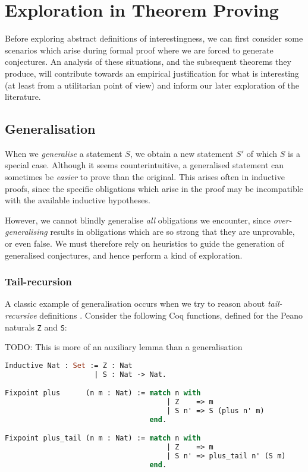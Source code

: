 \documentclass[]{article}
\begin{document}
\section{Exploration in Theorem Proving}
\label{examples}

Before exploring abstract definitions of interestingness, we can first consider some scenarios which arise during formal proof where we are forced to generate conjectures. An analysis of these situations, and the subsequent theorems they produce, will contribute towards an empirical justification for what is interesting (at least from a utilitarian point of view) and inform our later exploration of the literature.

\subsection{Generalisation}

\providecommand{\coq}[1]{\lstinline[language=ML]|#1|}

When we \emph{generalise} a statement $S$, we obtain a new statement $S'$ of which $S$ is a special case. Although it seems counterintuitive, a generalised statement can sometimes be \emph{easier} to prove than the original. This arises often in inductive proofs, since the specific obligations which arise in the proof may be incompatible with the available inductive hypotheses.

However, we cannot blindly generalise \emph{all} obligations we encounter, since \emph{over-generalising} results in obligations which are so strong that they are unprovable, or even false. We must therefore rely on heuristics to guide the generation of generalised conjectures, and hence perform a kind of exploration.

\subsubsection{Tail-recursion}

A classic example of generalisation occurs when we try to reason about \emph{tail-recursive} definitions \cite{kapur2003automatic}. Consider the following Coq functions, defined for the Peano naturals \coq{Z} and \coq{S}:

TODO: This is more of an auxiliary lemma than a generalisation

\begin{lstlisting}[language=ML, xleftmargin=.2\textwidth, xrightmargin=.2\textwidth]
Inductive Nat : Set := Z : Nat
                     | S : Nat -> Nat.

Fixpoint plus      (n m : Nat) := match n with
                                      | Z    => m
                                      | S n' => S (plus n' m)
                                  end.

Fixpoint plus_tail (n m : Nat) := match n with
                                      | Z    => m
                                      | S n' => plus_tail n' (S m)
                                  end.
\end{lstlisting}
\end{document}
